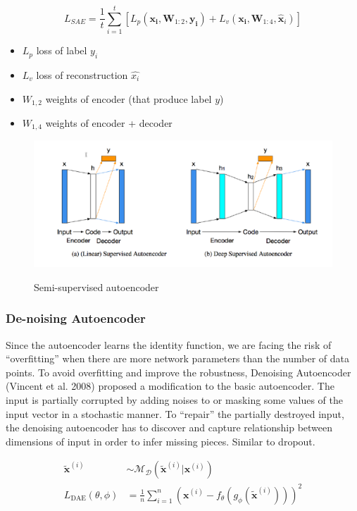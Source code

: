 \documentclass[main]{subfiles}
\begin{document}
\begin{equation}
    L_{SAE} = \frac{1}{t} \sum_{i=1}^t [L_p(\mathbf{x_i}, \mathbf{W}_{1:2}, \mathbf{y_i}) + L_v(\mathbf{x_i}, \mathbf{W}_{1:4}, \hat{\mathbf{x}}_i)]
\end{equation}

\begin{itemize}
    \item $L_p$ loss of label $y_i$
    \item $L_v$ loss of reconstruction $\hat{x_i}$
    \item $W_{1,2}$ weights of encoder (that produce label $y$)
    \item $W_{1,4}$ weights of encoder + decoder
\end{itemize}

\begin{figure}[H]
	\centering
	\includegraphics[width=0.8\linewidth]{07_UnsupervisedAndSelfsupervisedLearning/figures/autoencoder-semi.png}
	\label{fig:autoencoder-semi}
	\caption{Semi-supervised autoencoder}
\end{figure}

\subsubsection{De-noising Autoencoder}
Since the autoencoder learns the identity function, we are facing the risk of “overfitting” when there are more network parameters than the number of data points. To avoid overfitting and improve the robustness, Denoising Autoencoder (Vincent et al. 2008) proposed a modification to the basic autoencoder. The input is partially corrupted by adding noises to or masking some values of the input vector in a stochastic manner. To “repair” the partially destroyed input, the denoising autoencoder has to discover and capture relationship between dimensions of input in order to infer missing pieces. Similar to dropout.

\begin{align}
\tilde{\mathbf{x}}^{(i)} &\sim \mathcal{M}_\mathcal{D}(\tilde{\mathbf{x}}^{(i)} \vert \mathbf{x}^{(i)})\\
L_\text{DAE}(\theta, \phi) &= \frac{1}{n} \sum_{i=1}^n (\mathbf{x}^{(i)} - f_\theta(g_\phi(\tilde{\mathbf{x}}^{(i)})))^2
\end{align}
\end{document}
